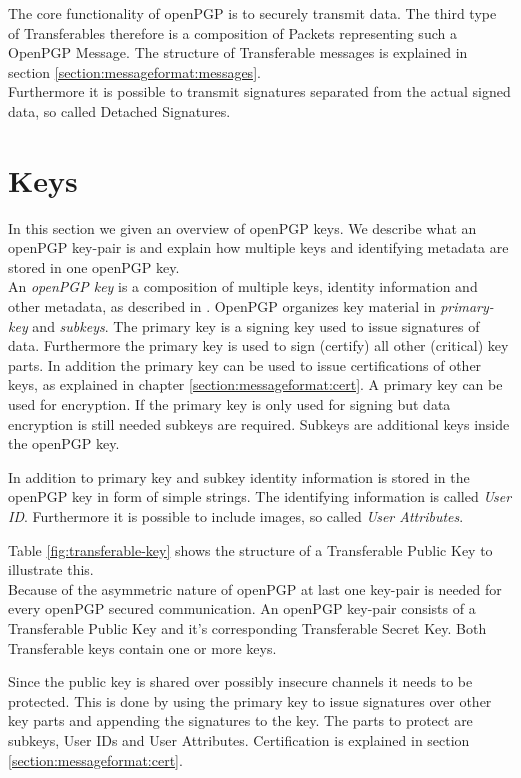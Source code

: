 The core functionality of openPGP is to securely transmit data. The third type of Transferables therefore is a composition of Packets representing such a OpenPGP Message. The structure of Transferable messages is explained in section \ref{section:messageformat:messages}. \\

Furthermore it is possible to transmit signatures separated from the actual signed data, so called Detached Signatures.

\section{Keys}
\label{section:messageformat:keys}

In this section we given an overview of openPGP keys. We describe what an openPGP key-pair is and explain how multiple keys and identifying metadata are stored in one openPGP key. \\

An \textit{openPGP key} is a composition of multiple keys, identity information and other metadata, as described in  \cite[section 11.1]{RFC4880}. OpenPGP organizes key material in \textit{primary-key} and \textit{subkeys}. The primary key is a signing key used to issue signatures of data. Furthermore the primary key is used to sign (certify) all other (critical) key parts. In addition the primary key can be used to issue certifications of other keys, as explained in chapter \ref{section:messageformat:cert}. A primary key can be used for encryption. If the primary key is only used for  signing but data encryption is still needed subkeys are required. Subkeys are additional keys inside the openPGP key. 

In addition to primary key and subkey identity information is stored in the openPGP key in form of simple strings. The identifying information is called \textit{User ID}. Furthermore it is possible to include images, so called \textit{User Attributes}. 

Table \ref{fig:transferable-key} shows the structure of a Transferable Public Key to illustrate this. \\

Because of the  asymmetric nature of openPGP at last one key-pair is needed for every openPGP secured communication. An openPGP key-pair consists of a Transferable Public Key and it's corresponding Transferable Secret Key. Both Transferable keys contain one or more keys. 


Since the public key is shared over possibly insecure channels it needs to be protected. This is done by using the primary key to issue signatures over other key parts and appending the signatures to the key. The parts to protect are subkeys, User IDs and User Attributes. Certification is explained in section \ref{section:messageformat:cert}. \\


